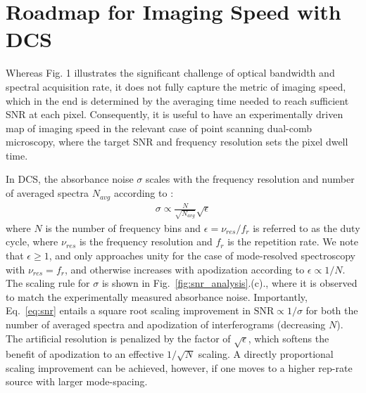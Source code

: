 \documentclass[aip,reprint]{revtex4-1}
\begin{document}
\section{Roadmap for Imaging Speed with DCS}
Whereas Fig. 1 illustrates the significant challenge of optical bandwidth and spectral acquisition rate, it does not fully capture the metric of imaging speed, which in the end is determined by the averaging time needed to reach sufficient SNR at each pixel. Consequently, it is useful to have an experimentally driven map of imaging speed in the relevant case of point scanning dual-comb microscopy, where the target SNR and frequency resolution sets the pixel dwell time.

In DCS, the absorbance noise $\sigma$ scales with the frequency resolution and number of averaged spectra $N_{avg}$ according to \cite{newburySensitivityCoherentDualcomb2010}: 
% 
\begin{align}
    \sigma \propto \frac{N}{\sqrt{N_{avg}}}\sqrt{\epsilon}
    \label{eq:snr}
\end{align}
% 
where $N$ is the number of frequency bins and $\epsilon=\nu_{res}/f_{r}$ is referred to as the duty cycle, where $\nu_{res}$ is the frequency resolution and $f_r$ is the repetition rate. We note that $\epsilon\geq 1$, and only approaches unity for the case of mode-resolved spectroscopy with $\nu_{res}=f_r$, and otherwise increases with apodization according to $\epsilon\propto1/N$. The scaling rule for $\sigma$ is shown in \mbox{Fig. \ref{fig:snr_analysis}.(c).}, where it is observed to match the experimentally measured absorbance noise. Importantly, \mbox{Eq. \ref{eq:snr}} entails a square root scaling improvement in \mbox{$\mathrm{SNR}\propto 1/\sigma$} for both the number of averaged spectra and apodization of interferograms (decreasing $N$). The artificial resolution is penalized by the factor of $\sqrt{\epsilon}$, which softens the benefit of apodization to an effective $1/\sqrt{N}$ scaling. A directly proportional scaling improvement can be achieved, however, if one moves to a higher rep-rate source with larger mode-spacing.
\end{document}
